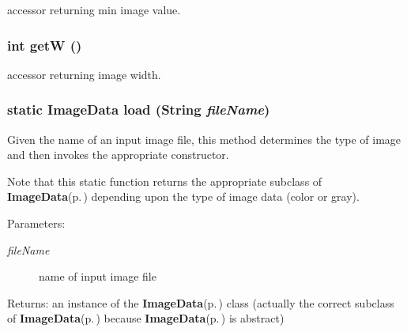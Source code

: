 accessor returning min image value. 

\subsubsection{\setlength{\rightskip}{0pt plus 5cm}int get\-W ()}\label{class_c_s_image_viewer_1_1_image_data_3aefd997355d42089a4dae14cd22b0b7}


accessor returning image width. 

\subsubsection{\setlength{\rightskip}{0pt plus 5cm}static {\bf Image\-Data} load (String {\em file\-Name})\hspace{0.3cm}{\tt  [static]}}\label{class_c_s_image_viewer_1_1_image_data_ead1d6066aef00aa2e8c6ee4405d5c2d}


Given the name of an input image file, this method determines the type of image and then invokes the appropriate constructor. 

Note that this static function returns the appropriate subclass of {\bf Image\-Data}{\rm (p.\,\pageref{class_c_s_image_viewer_1_1_image_data})} depending upon the type of image data (color or gray).

\begin{Desc}
\item[Parameters:]
\begin{description}
\item[{\em file\-Name}]name of input image file \end{description}
\end{Desc}
\begin{Desc}
\item[Returns:]an instance of the {\bf Image\-Data}{\rm (p.\,\pageref{class_c_s_image_viewer_1_1_image_data})} class (actually the correct subclass of {\bf Image\-Data}{\rm (p.\,\pageref{class_c_s_image_viewer_1_1_image_data})} because {\bf Image\-Data}{\rm (p.\,\pageref{class_c_s_image_viewer_1_1_image_data})} is abstract) \end{Desc}
